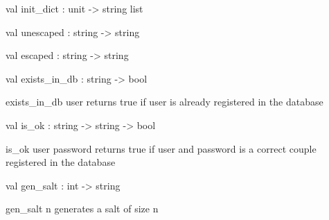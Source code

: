 \documentclass[11pt]{article}
\begin{document}
\label{val:Server.init-underscoredict}\begin{ocamldoccode}
val init_dict : unit -> string list
\end{ocamldoccode}




\label{val:Server.unescaped}\begin{ocamldoccode}
val unescaped : string -> string
\end{ocamldoccode}




\label{val:Server.escaped}\begin{ocamldoccode}
val escaped : string -> string
\end{ocamldoccode}




\label{val:Server.exists-underscorein-underscoredb}\begin{ocamldoccode}
val exists_in_db : string -> bool
\end{ocamldoccode}
\begin{ocamldocdescription}
exists\_in\_db user returns true if user is already registered in the database


\end{ocamldocdescription}




\label{val:Server.is-underscoreok}\begin{ocamldoccode}
val is_ok : string -> string -> bool
\end{ocamldoccode}
\begin{ocamldocdescription}
is\_ok user password returns true if user and password is a correct couple registered in the database


\end{ocamldocdescription}




\label{val:Server.gen-underscoresalt}\begin{ocamldoccode}
val gen_salt : int -> string
\end{ocamldoccode}
\begin{ocamldocdescription}
gen\_salt n generates a salt of size n


\end{ocamldocdescription}
\end{document}
